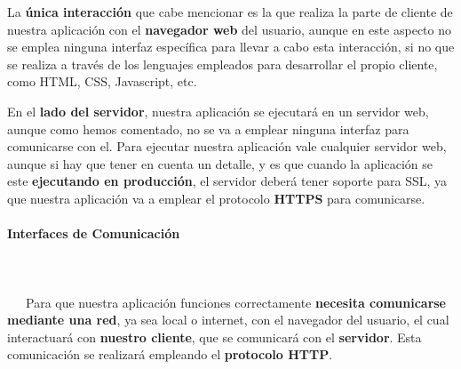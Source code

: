 La \textbf{única interacción} que cabe mencionar es la que realiza la parte de cliente de nuestra aplicación con el \textbf{navegador web} del usuario, aunque en este aspecto no se emplea ninguna interfaz específica para llevar a cabo esta interacción, si no que se realiza a través de los lenguajes empleados para desarrollar el propio cliente, como HTML, CSS, Javascript, etc.

En el \textbf{lado del servidor}, nuestra aplicación se ejecutará en un servidor web, aunque como hemos comentado, no se va a emplear ninguna interfaz para comunicarse con el. Para ejecutar nuestra aplicación vale cualquier servidor web, aunque si hay que tener en cuenta un detalle, y es que cuando la aplicación se este \textbf{ejecutando en producción}, el servidor deberá tener soporte para \gls{SSL}, ya que nuestra aplicación va a emplear el protocolo \textbf{HTTPS} para comunicarse.

\paragraph{Interfaces de Comunicación}
~\\\\
\-\ \-\ \-\ Para que nuestra aplicación funciones correctamente \textbf{necesita comunicarse mediante una red}, ya sea local o internet, con el navegador del usuario, el cual interactuará con \textbf{nuestro cliente}, que se comunicará con el \textbf{servidor}. Esta comunicación se realizará empleando el \textbf{protocolo \gls{HTTP}}.


\newpage

\appendix

